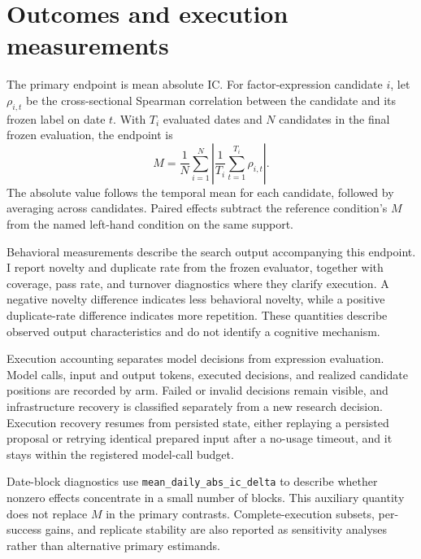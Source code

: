 \section{Outcomes and execution measurements}
\label{sec:metrics}

The primary endpoint is mean absolute IC. For factor-expression candidate $i$, let $\rho_{i,t}$ be the cross-sectional Spearman correlation between the candidate and its frozen label on date $t$. With $T_i$ evaluated dates and $N$ candidates in the final frozen evaluation, the endpoint is
\begin{equation}
M=\frac{1}{N}\sum_{i=1}^{N}\left|\frac{1}{T_i}\sum_{t=1}^{T_i}\rho_{i,t}\right|.
\label{eq:mean-abs-ic}
\end{equation}
The absolute value follows the temporal mean for each candidate, followed by averaging across candidates. Paired effects subtract the reference condition's $M$ from the named left-hand condition on the same support.

Behavioral measurements describe the search output accompanying this endpoint. I report novelty and duplicate rate from the frozen evaluator, together with coverage, pass rate, and turnover diagnostics where they clarify execution. A negative novelty difference indicates less behavioral novelty, while a positive duplicate-rate difference indicates more repetition. These quantities describe observed output characteristics and do not identify a cognitive mechanism.

Execution accounting separates model decisions from expression evaluation. Model calls, input and output tokens, executed decisions, and realized candidate positions are recorded by arm. Failed or invalid decisions remain visible, and infrastructure recovery is classified separately from a new research decision. Execution recovery resumes from persisted state, either replaying a persisted proposal or retrying identical prepared input after a no-usage timeout, and it stays within the registered model-call budget.

Date-block diagnostics use \texttt{mean\_daily\_abs\_ic\_delta} to describe whether nonzero effects concentrate in a small number of blocks. This auxiliary quantity does not replace $M$ in the primary contrasts. Complete-execution subsets, per-success gains, and replicate stability are also reported as sensitivity analyses rather than alternative primary estimands.
